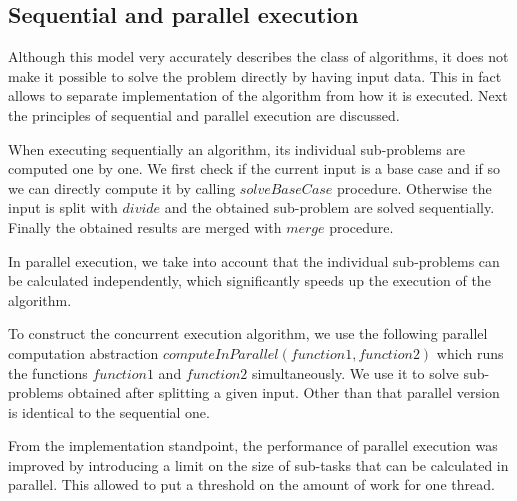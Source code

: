 \documentclass[a4paper,english,numberwithinsect,notab]{eurocg20-submission}
\begin{document}
	


	
	
\subsection{Sequential and parallel execution}
	
	
	Although this model very accurately describes the class of algorithms, it does not make it possible to solve the problem directly by having input data. This in fact allows to separate implementation of the algorithm from how it is executed. Next the principles of sequential and parallel execution are discussed.
	
	When executing sequentially an algorithm, its individual sub-problems are computed one by one. We first check if the current input is a base case and if so we can directly compute it by calling $solveBaseCase$ procedure. Otherwise the input is split with $divide$ and the obtained sub-problem are solved sequentially. Finally the obtained results are merged with $merge$ procedure.
	
	In parallel execution, we take into account that the individual sub-problems can be calculated independently, which significantly speeds up the execution of the algorithm.
	
	To construct the concurrent execution algorithm, we use the following parallel computation abstraction $computeInParallel(function1, function2)$ which runs the functions $function1$ and $function2$ simultaneously. We use it to solve sub-problems obtained after splitting a given input. Other than that parallel version is identical to the sequential one.
	
	From the implementation standpoint, the performance of parallel execution was improved by introducing a limit on the size of sub-tasks that can be calculated in parallel. This allowed to put a threshold on the amount of work for one thread.
\end{document}
